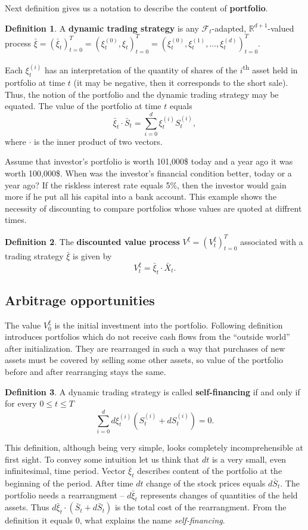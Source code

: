 \documentclass[a4paper,11pt, twoside]{book}
\theoremstyle{definition}
\newtheorem{mydef}{Definition}[chapter]
\theoremstyle{remark}
\def\R{{\mathbb{R}}}
\def\Sa{\bar{S}}
\def\Xa{\bar{X}}
\def\xia{\bar{\xi}}
\begin{document}
Next definition gives us a notation to describe the content of \textbf{portfolio}.
\begin{mydef}
A \textbf{dynamic trading strategy} is any $\mathcal{F}_t$-adapted,  $\R^{d+1}$-valued process $\xia = (\xia_t)_{t=0}^T = (\xi^{(0)}_t, \xi_t)_{t=0}^T = (\xi^{(0)}_t, \xi^{(1)}_t, \ldots, \xi^{(d)}_t)_{t=0}^T$.
\end{mydef}
Each $\xi^{(i)}_t$ has an interpretation of the quantity of shares of the $i$\textsuperscript{th} asset held in portfolio at time $t$ (it may be negative, then it corresponds to the short sale). Thus, the notion of the portfolio and the dynamic trading strategy may be equated. The value of the portfolio at time $t$ equals
\[\xia_t \cdot \Sa_t = \sum\limits_{i=0}^d \xi^{(i)}_t S^{(i)}_t,\]
where $\cdot$ is the inner product of two vectors.

Assume that investor's portfolio is worth 101,000\$ today and a year ago it was worth 100,000\$. When was the investor's financial condition better, today or a year ago? If the riskless interest rate equals 5\%, then the investor would gain more if he put all his capital into a bank account. This example shows the necessity of discounting to compare portfolios whose values are quoted at diffrent times.
\begin{mydef}
 The \textbf{discounted value process} $V^{\xi} = (V^{\xi}_t)_{t=0}^T$ associated with a trading strategy $\xia$ is given by 
 \begin{equation*}
  V^{\xi}_t = \xia_t \cdot \Xa_t.
 \end{equation*}
\end{mydef}

\subsection{Arbitrage opportunities}
The value $V^{\xi}_0$ is the initial investment into the portfolio. Following definition introduces portfolios which do not receive cash flows from the ``outside world'' after initialization. They are rearranged in such a way that purchases of new assets must be covered by selling some other assets, so value of the portfolio before and after rearranging stays the same.
\begin{mydef}
 A dynamic trading strategy is called \textbf{self-financing} if and only if for every $0 \leq t \leq T$
 \[ \sum\limits_{i=0}^d d\xi^{(i)}_t (S^{(i)}_t + dS^{(i)}_t) = 0. \]
\end{mydef}
This definition, although being very simple, looks completely incomprehensible at first sight. To convey some intuition let us think that $dt$ is a very small, even infinitesimal, time period. Vector $\xia_t$ describes content of the portfolio at the beginning of the period. After time $dt$ change of the stock prices equals $d\Sa_t$. The portfolio needs a rearrangment -- $d\xia_t$ represents changes of quantities of the held assets.
Thus $d\xia_t \cdot (\Sa_t + d\Sa_t)$ is the total cost of the rearrangment. From the definition it equals 0, what explains the name \textit{self-financing}.
\end{document}
